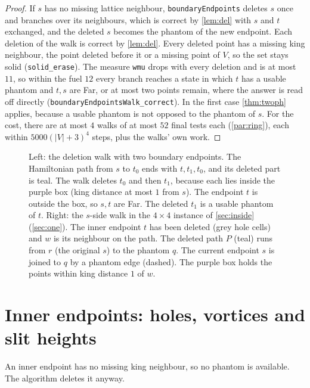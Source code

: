 \documentclass[11pt]{article}
\theoremstyle{plain}
\theoremstyle{definition}
\theoremstyle{remark}
\newcommand{\lean}[1]{\texttt{#1}}
\begin{document}
\begin{proof}
If $s$ has no missing lattice neighbour, \lean{boundaryEndpoints} deletes $s$ once and branches over
its neighbours, which is correct by \cref{lem:del} with $s$ and $t$ exchanged, and the deleted $s$
becomes the phantom of the new endpoint.
Each deletion of the walk is correct by \cref{lem:del}.
Every deleted point has a missing king neighbour, the point deleted before it or a missing point
of $V$, so the set stays solid (\lean{solid\_erase}).
The measure \lean{wmu} drops with every deletion and is at most $11$, so within the fuel $12$ every
branch reaches a state in which $t$ has a usable phantom and $t,s$ are Far, or at most two points
remain, where the answer is read off directly (\lean{boundaryEndpointsWalk\_correct}).
In the first case \cref{thm:twoph} applies, because a usable phantom is not opposed to the phantom
of $s$.
For the cost, there are at most $4$ walks of at most $52$ final tests each (\cref{par:ring}), each
within $5000(|V|+3)^4$ steps, plus the walks' own work.
\end{proof}

\begin{figure}[t]
\centering

\caption{Left: the deletion walk with two boundary endpoints.
The Hamiltonian path from $s$ to $t_0$ ends with $t,t_1,t_0$, and its deleted part is teal.
The walk deletes $t_0$ and then $t_1$, because each lies inside the purple box (king distance at
most $1$ from $s$).
The endpoint $t$ is outside the box, so $s,t$ are Far.
The deleted $t_1$ is a usable phantom of $t$.
Right: the $s$-side walk in the $4\times4$ instance of \cref{sec:inside} (\cref{sec:one}).
The inner endpoint $t$ has been deleted (grey hole cells) and $w$ is its neighbour on the path.
The deleted path $P$ (teal) runs from $r$ (the original $s$) to the phantom $q$.
The current endpoint $s$ is joined to $q$ by a phantom edge (dashed).
The purple box holds the points within king distance $1$ of $w$.}
\label{fig:walk}
\end{figure}

\section{Inner endpoints: holes, vortices and slit heights}
\label{sec:vortex}

An inner endpoint has no missing king neighbour, so no phantom is available.
The algorithm deletes it anyway.
\end{document}
